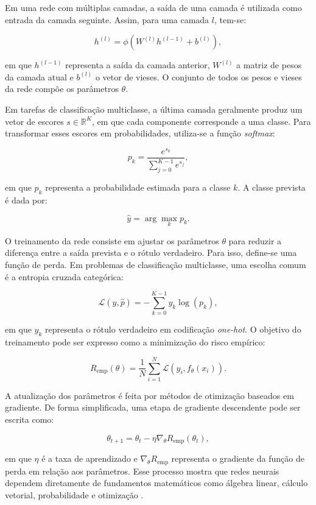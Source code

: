 \documentclass[
    12pt,
    openright,
    oneside,
    a4paper,
    english,
    brazil
]{abntex2}
\begin{document}
Em uma rede com múltiplas camadas, a saída de uma camada é utilizada como entrada da camada seguinte. Assim, para uma camada \(l\), tem-se:

\[
h^{(l)} = \phi\left(W^{(l)}h^{(l-1)} + b^{(l)}\right),
\]

em que \(h^{(l-1)}\) representa a saída da camada anterior, \(W^{(l)}\) a matriz de pesos da camada atual e \(b^{(l)}\) o vetor de vieses. O conjunto de todos os pesos e vieses da rede compõe os parâmetros \(\theta\).

Em tarefas de classificação multiclasse, a última camada geralmente produz um vetor de escores \(s \in \mathbb{R}^{K}\), em que cada componente corresponde a uma classe. Para transformar esses escores em probabilidades, utiliza-se a função \textit{softmax}:

\[
p_k =
\frac{e^{s_k}}
{\sum_{j=0}^{K-1} e^{s_j}},
\]

em que \(p_k\) representa a probabilidade estimada para a classe \(k\). A classe prevista é dada por:

\[
\hat{y} = \arg\max_k p_k.
\]

O treinamento da rede consiste em ajustar os parâmetros \(\theta\) para reduzir a diferença entre a saída prevista e o rótulo verdadeiro. Para isso, define-se uma função de perda. Em problemas de classificação multiclasse, uma escolha comum é a entropia cruzada categórica:

\[
\mathcal{L}(y,\hat{p}) =
-\sum_{k=0}^{K-1} y_k \log(p_k),
\]

em que \(y_k\) representa o rótulo verdadeiro em codificação \textit{one-hot}. O objetivo do treinamento pode ser expresso como a minimização do risco empírico:

\[
R_{\text{emp}}(\theta) =
\frac{1}{N}
\sum_{i=1}^{N}
\mathcal{L}(y_i, f_{\theta}(x_i)).
\]

A atualização dos parâmetros é feita por métodos de otimização baseados em gradiente. De forma simplificada, uma etapa de gradiente descendente pode ser escrita como:

\[
\theta_{t+1}
=
\theta_t
-
\eta \nabla_{\theta}R_{\text{emp}}(\theta_t),
\]

em que \(\eta\) é a taxa de aprendizado e \(\nabla_{\theta}R_{\text{emp}}\) representa o gradiente da função de perda em relação aos parâmetros. Esse processo mostra que redes neurais dependem diretamente de fundamentos matemáticos como álgebra linear, cálculo vetorial, probabilidade e otimização \cite{deisenroth2020mathematics}.
\end{document}

